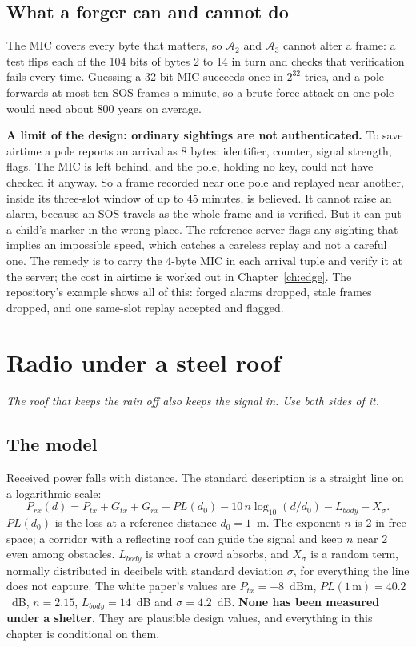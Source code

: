 \documentclass[11pt,a4paper,twoside,openany]{book}
\newcommand{\hook}[1]{{\noindent\fontsize{13}{19}\selectfont\itshape\color{rsmuted}#1\par}\vspace{12pt}}
\begin{document}
\section{What a forger can and cannot do}
The MIC covers every byte that matters, so $\mathcal A_2$ and $\mathcal A_3$ cannot alter a frame: a test flips each of
the 104 bits of bytes 2 to 14 in turn and checks that verification fails every time. Guessing a 32-bit MIC succeeds
once in $2^{32}$ tries, and a pole forwards at most ten SOS frames a minute, so a brute-force attack on one pole would
need about 800 years on average.

\begin{finding}\textbf{A limit of the design: ordinary sightings are not authenticated.} To save airtime a pole reports
an arrival as 8 bytes: identifier, counter, signal strength, flags. The MIC is left behind, and the pole, holding no
key, could not have checked it anyway. So a frame recorded near one pole and replayed near another, inside its
three-slot window of up to 45 minutes, is believed. It cannot raise an alarm, because an SOS travels as the whole frame
and is verified. But it can put a child's marker in the wrong place. The reference server flags any sighting that
implies an impossible speed, which catches a careless replay and not a careful one. The remedy is to carry the 4-byte
MIC in each arrival tuple and verify it at the server; the cost in airtime is worked out in Chapter~\ref{ch:edge}.
The repository's example  shows all of this: forged alarms dropped, stale frames dropped, and
one same-slot replay accepted and flagged.\end{finding}

\chapter{Radio under a steel roof}\label{ch:radio}
\hook{The roof that keeps the rain off also keeps the signal in. Use both sides of it.}
\section{The model}
Received power falls with distance. The standard description is a straight line on a logarithmic scale:
\begin{equation}P_{rx}(d)=P_{tx}+G_{tx}+G_{rx}-PL(d_0)-10\,n\log_{10}(d/d_0)-L_{body}-X_\sigma.\label{eq:pl}\end{equation}
$PL(d_0)$ is the loss at a reference distance $d_0=1$~m. The exponent $n$ is 2 in free space; a corridor with a
reflecting roof can guide the signal and keep $n$ near 2 even among obstacles. $L_{body}$ is what a crowd absorbs, and
$X_\sigma$ is a random term, normally distributed in decibels with standard deviation $\sigma$, for everything the
line does not capture. The white paper's values are $P_{tx}=+8$~dBm, $PL(1\,\mathrm m)=40.2$~dB, $n=2.15$,
$L_{body}=14$~dB and $\sigma=4.2$~dB. \textbf{None has been measured under a shelter.} They are plausible design
values, and everything in this chapter is conditional on them.
\end{document}
